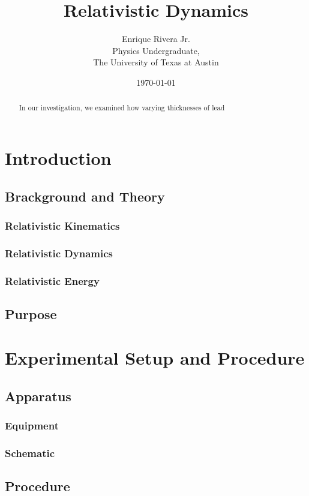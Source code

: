 \documentclass[12pt]{article}
\title{Relativistic Dynamics}
\author{Enrique Rivera Jr. \\
        Physics Undergraduate, \\ 
        The University of Texas at Austin}
\date{\today}
\begin{document}
\maketitle

\begin{abstract}
    In our investigation, we examined how varying thicknesses of lead
\end{abstract}

\section{Introduction}
        \subsection[short]{Brackground and Theory}
                \subsubsection{Relativistic Kinematics}
                \subsubsection{Relativistic Dynamics}
                \subsubsection{Relativistic Energy}
        \subsection[short]{Purpose}


\section{Experimental Setup and Procedure}
        \subsection{Apparatus}
                \subsubsection{Equipment}
                \subsubsection{Schematic}
        \subsection{Procedure}
\end{document}
